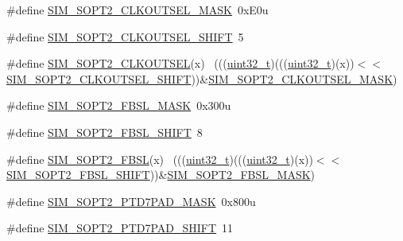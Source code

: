 \begin{DoxyCompactItemize}
\item 
\#define \hyperlink{group___s_i_m___register___masks_ga601bb7007f58e3ad5433d3538f4dcef0}{S\+I\+M\+\_\+\+S\+O\+P\+T2\+\_\+\+C\+L\+K\+O\+U\+T\+S\+E\+L\+\_\+\+M\+A\+SK}~0x\+E0u
\item 
\#define \hyperlink{group___s_i_m___register___masks_ga520c9a255ff79372237f5f332f749112}{S\+I\+M\+\_\+\+S\+O\+P\+T2\+\_\+\+C\+L\+K\+O\+U\+T\+S\+E\+L\+\_\+\+S\+H\+I\+FT}~5
\item 
\#define \hyperlink{group___s_i_m___register___masks_ga7faedd289e00fe163a5dc4f22b9fa3fb}{S\+I\+M\+\_\+\+S\+O\+P\+T2\+\_\+\+C\+L\+K\+O\+U\+T\+S\+EL}(x)                                  ~(((\hyperlink{_p_e___types_8h_a33594304e786b158f3fb30289278f5af}{uint32\+\_\+t})(((\hyperlink{_p_e___types_8h_a33594304e786b158f3fb30289278f5af}{uint32\+\_\+t})(x))$<$$<$\hyperlink{group___s_i_m___register___masks_ga520c9a255ff79372237f5f332f749112}{S\+I\+M\+\_\+\+S\+O\+P\+T2\+\_\+\+C\+L\+K\+O\+U\+T\+S\+E\+L\+\_\+\+S\+H\+I\+FT}))\&\hyperlink{group___s_i_m___register___masks_ga601bb7007f58e3ad5433d3538f4dcef0}{S\+I\+M\+\_\+\+S\+O\+P\+T2\+\_\+\+C\+L\+K\+O\+U\+T\+S\+E\+L\+\_\+\+M\+A\+SK})
\item 
\#define \hyperlink{group___s_i_m___register___masks_ga27b0cb220aaf94e8d04795bd682ebd78}{S\+I\+M\+\_\+\+S\+O\+P\+T2\+\_\+\+F\+B\+S\+L\+\_\+\+M\+A\+SK}~0x300u
\item 
\#define \hyperlink{group___s_i_m___register___masks_ga7077057e2a7f0841d8151d2703d85f16}{S\+I\+M\+\_\+\+S\+O\+P\+T2\+\_\+\+F\+B\+S\+L\+\_\+\+S\+H\+I\+FT}~8
\item 
\#define \hyperlink{group___s_i_m___register___masks_ga7bb05630a58acb5628192ffdb8207295}{S\+I\+M\+\_\+\+S\+O\+P\+T2\+\_\+\+F\+B\+SL}(x)                                            ~(((\hyperlink{_p_e___types_8h_a33594304e786b158f3fb30289278f5af}{uint32\+\_\+t})(((\hyperlink{_p_e___types_8h_a33594304e786b158f3fb30289278f5af}{uint32\+\_\+t})(x))$<$$<$\hyperlink{group___s_i_m___register___masks_ga7077057e2a7f0841d8151d2703d85f16}{S\+I\+M\+\_\+\+S\+O\+P\+T2\+\_\+\+F\+B\+S\+L\+\_\+\+S\+H\+I\+FT}))\&\hyperlink{group___s_i_m___register___masks_ga27b0cb220aaf94e8d04795bd682ebd78}{S\+I\+M\+\_\+\+S\+O\+P\+T2\+\_\+\+F\+B\+S\+L\+\_\+\+M\+A\+SK})
\item 
\#define \hyperlink{group___s_i_m___register___masks_gaf295c85205620f0ece4cf7a888fc298f}{S\+I\+M\+\_\+\+S\+O\+P\+T2\+\_\+\+P\+T\+D7\+P\+A\+D\+\_\+\+M\+A\+SK}~0x800u
\item 
\#define \hyperlink{group___s_i_m___register___masks_ga82543a91a19387f58f922371b4b5cc95}{S\+I\+M\+\_\+\+S\+O\+P\+T2\+\_\+\+P\+T\+D7\+P\+A\+D\+\_\+\+S\+H\+I\+FT}~11

\end{DoxyCompactItemize}
